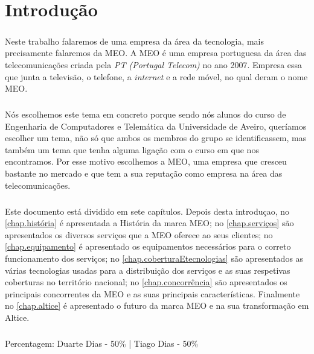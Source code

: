 \documentclass{report}
\begin{document}
\chapter{Introdução}
\label{chap.introducao}
\paragraph{}
	Neste trabalho falaremos de uma empresa da área da tecnologia, mais precisamente falaremos da MEO. A MEO é uma empresa portuguesa da área das telecomunicações criada pela \textit{PT (Portugal Telecom)} no ano 2007. Empresa essa que junta a televisão, o telefone, a \textit{internet} e a rede móvel, no qual deram o nome MEO.
	
\paragraph{}
	Nós escolhemos este tema em concreto porque sendo nós alunos do curso de Engenharia de Computadores e Telemática da Universidade de Aveiro, queríamos escolher um tema, não só que ambos os membros do grupo se identificassem, mas também um tema que tenha alguma ligação com o curso em que nos encontramos.  Por esse motivo escolhemos a MEO, uma empresa que cresceu bastante no mercado e que tem a sua reputação como empresa na área das telecomunicações. 
	
\paragraph{}
	Este documento está dividido em sete capítulos. Depois desta introduçao, no \autoref{chap.história} é apresentada a História da marca MEO; no \autoref{chap.serviços} são apresentados os diversos serviços que a MEO oferece ao seus clientes; no \autoref{chap.equipamento} é apresentado os equipamentos necessários para o correto funcionamento dos serviços; no \autoref{chap.coberturaEtecnologias} são apresentados as várias tecnologias usadas para a distribuição dos serviços e as suas respetivas coberturas no território nacional; no \autoref{chap.concorrência} são apresentados os principais concorrentes da MEO e as suas principais características. Finalmente no \autoref{chap.altice} é apresentado o futuro da marca MEO e na sua transformação em Altice. 
	
\paragraph{}\paragraph{}	
\centerline{Percentagem: Duarte Dias - 50\% | Tiago Dias - 50\%}
\end{document}
